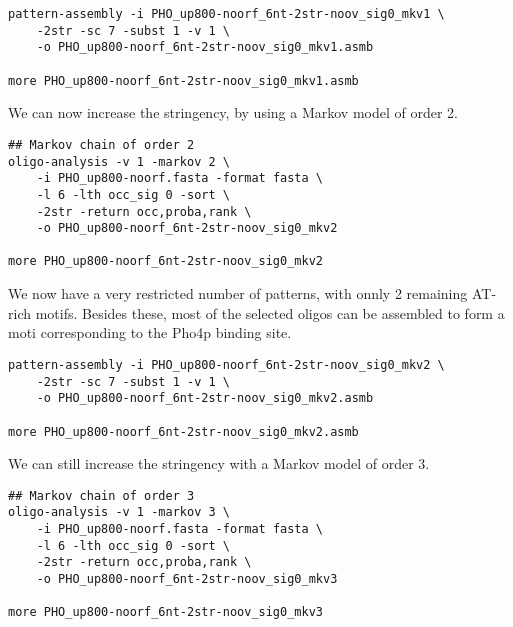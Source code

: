 {\color{Blue} \begin{footnotesize} 
\begin{verbatim}
pattern-assembly -i PHO_up800-noorf_6nt-2str-noov_sig0_mkv1 \
    -2str -sc 7 -subst 1 -v 1 \
    -o PHO_up800-noorf_6nt-2str-noov_sig0_mkv1.asmb

more PHO_up800-noorf_6nt-2str-noov_sig0_mkv1.asmb
\end{verbatim} \end{footnotesize}
}

We can now increase the stringency, by using a Markov model of order 2.

{\color{Blue} \begin{footnotesize} 
\begin{verbatim}
## Markov chain of order 2
oligo-analysis -v 1 -markov 2 \
    -i PHO_up800-noorf.fasta -format fasta \
    -l 6 -lth occ_sig 0 -sort \
    -2str -return occ,proba,rank \
    -o PHO_up800-noorf_6nt-2str-noov_sig0_mkv2

more PHO_up800-noorf_6nt-2str-noov_sig0_mkv2
\end{verbatim} \end{footnotesize}
}

We now have a very restricted number of patterns, with onnly 2
remaining AT-rich motifs. Besides these, most of the selected oligos
can be assembled to form a moti corresponding to the Pho4p binding
site.

{\color{Blue} \begin{footnotesize} 
\begin{verbatim}
pattern-assembly -i PHO_up800-noorf_6nt-2str-noov_sig0_mkv2 \
    -2str -sc 7 -subst 1 -v 1 \
    -o PHO_up800-noorf_6nt-2str-noov_sig0_mkv2.asmb

more PHO_up800-noorf_6nt-2str-noov_sig0_mkv2.asmb
\end{verbatim} \end{footnotesize}
}

We can still increase the stringency with a Markov model of order 3.

{\color{Blue} \begin{footnotesize}
\begin{verbatim}
## Markov chain of order 3
oligo-analysis -v 1 -markov 3 \
    -i PHO_up800-noorf.fasta -format fasta \
    -l 6 -lth occ_sig 0 -sort \
    -2str -return occ,proba,rank \
    -o PHO_up800-noorf_6nt-2str-noov_sig0_mkv3

more PHO_up800-noorf_6nt-2str-noov_sig0_mkv3
\end{verbatim} \end{footnotesize}
}

